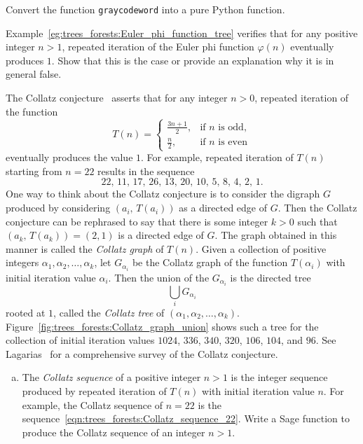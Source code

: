 \begin{problem}
\item Convert the function \texttt{graycodeword} into a pure Python
  function.

\item Example~\ref{eg:trees_forests:Euler_phi_function_tree} verifies
  that for any positive integer $n > 1$, repeated iteration of the
  Euler phi function $\varphi(n)$ eventually
  produces $1$. Show that this is the case or provide an explanation
  why it is in general false.

\item The Collatz
  conjecture~\cite{Lagarias1985} asserts that for any integer $n > 0$,
  repeated iteration of the function
  \[
  T(n)
  =
  \begin{cases}
  \frac{3n + 1}{2}, & \text{if $n$ is odd}, \\[4pt]
  \frac{n}{2}, & \text{if $n$ is even}
  \end{cases}
  \]
  eventually produces the value $1$. For example, repeated iteration
  of $T(n)$ starting from $n = 22$ results in the sequence
  \begin{equation}
  \label{eqn:trees_forests:Collatz_sequence_22}
  22,\, 11,\, 17,\, 26,\, 13,\, 20,\, 10,\, 5,\, 8,\, 4,\, 2,\, 1.
  \end{equation}
  One way to think about the Collatz
  conjecture is to consider the digraph $G$ produced by considering
  $(a_i,\, T(a_i))$ as a directed edge of $G$. Then the Collatz
  conjecture can be rephrased to say that there is some integer
  $k > 0$ such that $(a_k,\, T(a_k)) = (2, 1)$ is a directed edge of
  $G$. The graph obtained in this manner is called the
  \emph{Collatz graph} of $T(n)$. Given a
  collection of positive integers
  $\alpha_1, \alpha_2, \dots, \alpha_k$, let $G_{\alpha_i}$ be the
  Collatz graph of the function $T(\alpha_i)$ with initial iteration
  value $\alpha_i$. Then the union of the $G_{\alpha_i}$ is the
  directed tree
  \[
  \bigcup_i G_{\alpha_i}
  \]
  rooted at $1$, called the \emph{Collatz tree} of
  $(\alpha_1, \alpha_2, \dots, \alpha_k)$.
  Figure~\ref{fig:trees_forests:Collatz_graph_union} shows such a tree
  for the collection of initial iteration values $1024$, $336$, $340$,
  $320$, $106$, $104$, and $96$. See
  Lagarias~\cite{Lagarias2009a,Lagarias2009b}
  for a comprehensive survey of the Collatz
  conjecture.
  \begin{enumerate}[(a)]
  \item The \emph{Collatz sequence} of a
    positive integer $n > 1$ is the integer sequence produced by
    repeated iteration of $T(n)$ with initial iteration value $n$. For
    example, the Collatz sequence of $n = 22$ is the
    sequence~\eqref{eqn:trees_forests:Collatz_sequence_22}. Write a
    Sage function to produce the Collatz sequence of an integer $n > 1$.


\end{enumerate}
\end{problem}
